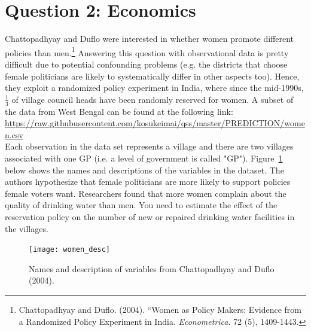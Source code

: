 \documentclass[12pt,letterpaper]{article}
\begin{document}
\section*{Question 2: Economics}
Chattopadhyay and Duflo were interested in whether women promote different policies than men.\footnote{Chattopadhyay and Duflo. (2004). ``Women as Policy Makers: Evidence from a Randomized Policy Experiment in India. \textit{Econometrica}. 72 (5), 1409-1443.} Answering this question with observational data is pretty difficult due to potential confounding problems (e.g. the districts that choose female politicians are likely to systematically differ in other aspects too). Hence, they exploit a randomized policy experiment in India, where since the mid-1990s, $\frac{1}{3}$ of village council heads have been randomly reserved for women. A subset of the data from West Bengal can be found at the following link: \url{https://raw.githubusercontent.com/kosukeimai/qss/master/PREDICTION/women.csv}\\

\noindent Each observation in the data set represents a village and there are two villages associated with one GP (i.e. a level of government is called "GP"). Figure~\ref{fig:women_desc} below shows the names and descriptions of the variables in the dataset. The authors hypothesize that female politicians are more likely to support policies female voters want. Researchers found that more women complain about the quality of drinking water than men. You need to estimate the effect of the reservation policy on the number of new or repaired drinking water facilities in the villages.
\vspace{.5cm}
\graphicspath{{./StatsI_Fall2023/}}
\begin{figure}[h!]
	\caption{\footnotesize{Names and description of variables from Chattopadhyay and Duflo (2004).}}
	\vspace{.5cm}
	\centering
	\label{fig:women_desc}
	\texttt{[image: women\_desc]}
\end{figure}		
\end{document}
